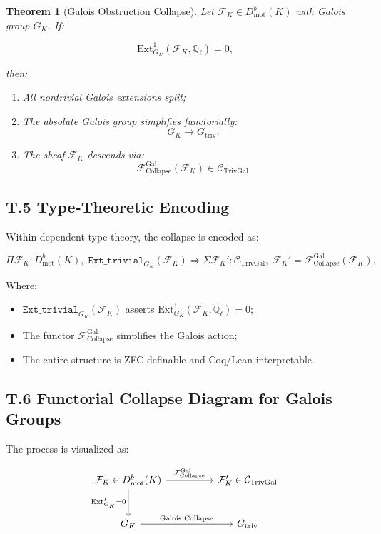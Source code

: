 \documentclass[11pt]{article}
\newtheorem{theorem}{Theorem}[section]
\begin{document}
\begin{theorem}[Galois Obstruction Collapse]
Let $\mathcal{F}_K \in D^b_{\mathrm{mot}}(K)$ with Galois group $G_K$. If:

\[
\mathrm{Ext}^1_{G_K}(\mathcal{F}_K, \mathbb{Q}_\ell) = 0,
\]

then:
\begin{enumerate}
    \item All nontrivial Galois extensions split;
    \item The absolute Galois group simplifies functorially:
    \[
    G_K \longrightarrow G_{\mathrm{triv}};
    \]
    \item The sheaf $\mathcal{F}_K$ descends via:
    \[
    \mathcal{F}_{\mathrm{Collapse}}^{\mathrm{Gal}}(\mathcal{F}_K) \in \mathcal{C}_{\mathrm{TrivGal}}.
    \]
\end{enumerate}
\end{theorem}

\subsection*{T.5 Type-Theoretic Encoding}

Within dependent type theory, the collapse is encoded as:

\[
\Pi \mathcal{F}_K : D^b_{\mathrm{mot}}(K),\;
\texttt{Ext\_trivial}_{G_K}(\mathcal{F}_K)
\Rightarrow
\Sigma \mathcal{F}_K' : \mathcal{C}_{\mathrm{TrivGal}},\;
\mathcal{F}_K' = \mathcal{F}_{\mathrm{Collapse}}^{\mathrm{Gal}}(\mathcal{F}_K).
\]

Where:
\begin{itemize}
    \item $\texttt{Ext\_trivial}_{G_K}(\mathcal{F}_K)$ asserts $\mathrm{Ext}^1_{G_K}(\mathcal{F}_K, \mathbb{Q}_\ell) = 0$;
    \item The functor $\mathcal{F}_{\mathrm{Collapse}}^{\mathrm{Gal}}$ simplifies the Galois action;
    \item The entire structure is ZFC-definable and Coq/Lean-interpretable.
\end{itemize}

\subsection*{T.6 Functorial Collapse Diagram for Galois Groups}

The process is visualized as:

\[
\begin{tikzcd}[column sep=huge, row sep=large]
\mathcal{F}_K \in D^b_{\mathrm{mot}}(K) \arrow[r, "{\mathcal{F}_{\mathrm{Collapse}}^{\mathrm{Gal}}}"] \arrow[d, swap, "{\mathrm{Ext}^1_{G_K} = 0}"]
& \mathcal{F}_K' \in \mathcal{C}_{\mathrm{TrivGal}} \\
G_K \arrow[r, "{\text{Galois Collapse}}"]
& G_{\mathrm{triv}}
\end{tikzcd}
\]
\end{document}
